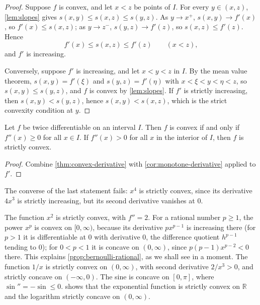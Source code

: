 \begin{proof}
Suppose $f$ is convex, and let $x<z$ be points of $I$. For every $y\in(x,z)$, \cref{lem:slopes} gives $s(x,y)\le s(x,z)\le s(y,z)$. As $y\to x^+$, $s(x,y)\to f'(x)$, so $f'(x)\le s(x,z)$; as $y\to z^-$, $s(y,z)\to f'(z)$, so $s(x,z)\le f'(z)$. Hence
\begin{equation}
f'(x)\le s(x,z)\le f'(z)\qquad(x<z),
\label{eq:convex-slopes}
\end{equation}
and $f'$ is increasing.

Conversely, suppose $f'$ is increasing, and let $x<y<z$ in $I$. By the mean value theorem, $s(x,y)=f'(\xi)$ and $s(y,z)=f'(\eta)$ with $x<\xi<y<\eta<z$, so $s(x,y)\le s(y,z)$, and $f$ is convex by \cref{lem:slopes}. If $f'$ is strictly increasing, then $s(x,y)<s(y,z)$, hence $s(x,y)<s(x,z)$, which is the strict convexity condition at $y$.
\end{proof}

\begin{corollary}
\label{cor:convex-second}
Let $f$ be twice differentiable on an interval $I$. Then $f$ is convex if and only if $f''(x)\ge0$ for all $x\in I$. If $f''(x)>0$ for all $x$ in the interior of $I$, then $f$ is strictly convex.
\end{corollary}

\begin{proof}
Combine \cref{thm:convex-derivative} with \cref{cor:monotone-derivative} applied to $f'$.
\end{proof}

The converse of the last statement fails: $x^4$ is strictly convex, since its derivative $4x^3$ is strictly increasing, but its second derivative vanishes at $0$.

The function $x^2$ is strictly convex, with $f''=2$. For a rational number $p\ge1$, the power $x^p$ is convex on $[0,\infty)$, because its derivative $px^{p-1}$ is increasing there (for $p>1$ it is differentiable at $0$ with derivative $0$, the difference quotient $h^{p-1}$ tending to $0$); for $0<p<1$ it is concave on $(0,\infty)$, since $p(p-1)x^{p-2}<0$ there. This explains \cref{prop:bernoulli-rational}, as we shall see in a moment. The function $1/x$ is strictly convex on $(0,\infty)$, with second derivative $2/x^3>0$, and strictly concave on $(-\infty,0)$. The sine is concave on $[0,\pi]$, where $\sin''=-\sin\le0$.  shows that the exponential function is strictly convex on $\mathbb R$ and the logarithm strictly concave on $(0,\infty)$.

